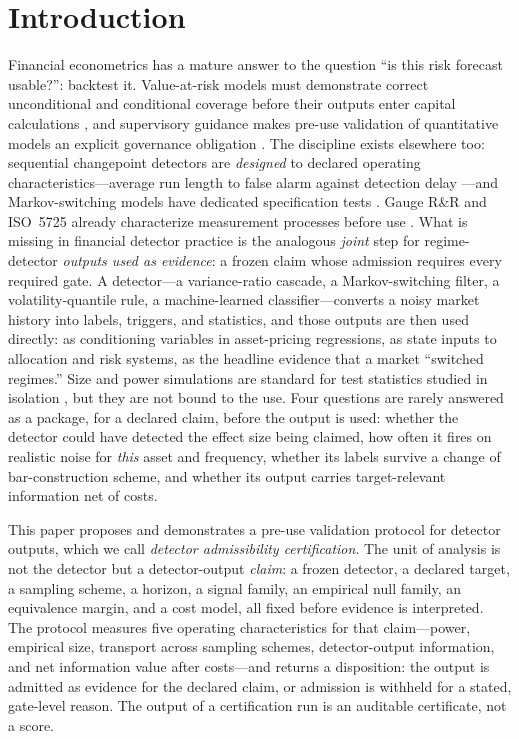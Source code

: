 \documentclass[3p]{elsarticle}
\begin{document}
\section{Introduction}
\label{sec:introduction}

Financial econometrics has a mature answer to the question ``is this risk
forecast usable?'': backtest it. Value-at-risk models must demonstrate correct
unconditional and conditional coverage before their outputs enter capital
calculations \citep{Kupiec1995,Christoffersen1998}, and supervisory guidance
makes pre-use validation of quantitative models an explicit governance
obligation \citep{FederalReserveOCC2011}. The discipline exists elsewhere
too: sequential changepoint detectors are \emph{designed} to declared
operating characteristics---average run length to false alarm against
detection delay \citep{Page1954,Lorden1971}---and Markov-switching models
have dedicated specification tests \citep{Hamilton1996}. Gauge R\&R and ISO~5725 already characterize measurement processes before
use \citep{NISTGaugeRR,ISO5725-1:2023}. What is missing in financial
detector practice is the analogous \emph{joint} step for regime-detector
\emph{outputs used as evidence}: a frozen claim whose admission requires every required gate. A detector---a variance-ratio cascade, a Markov-switching filter, a
volatility-quantile rule, a machine-learned classifier---converts a noisy
market history into labels, triggers, and statistics, and those outputs are
then used directly: as conditioning variables in asset-pricing regressions, as
state inputs to allocation and risk systems, as the headline evidence that a
market ``switched regimes.'' Size and power simulations are standard for test
statistics studied in isolation \citep{LoMacKinlay1989}, but they are not
bound to the use. Four questions are rarely answered as a package, for a
declared claim, before the output is used: whether the detector could have
detected the effect size being claimed, how often it fires on realistic
noise for \emph{this} asset and frequency, whether its labels survive a
change of bar-construction scheme, and whether its output carries
target-relevant information net of costs.

This paper proposes and demonstrates a pre-use validation protocol for
detector outputs, which we call \emph{detector admissibility certification}.
The unit of analysis is not the detector but a detector-output \emph{claim}: a
frozen detector, a declared target, a sampling scheme, a horizon, a signal
family, an empirical null family, an equivalence margin, and a cost model,
all fixed before evidence is interpreted. The protocol measures five
operating characteristics for that claim---power, empirical size, transport
across sampling schemes, detector-output information, and net information
value after costs---and returns a disposition: the output is admitted as
evidence for the declared claim, or admission is withheld for a stated,
gate-level reason. The output of a certification run is an auditable
certificate, not a score.
\end{document}
